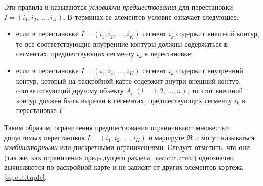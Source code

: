 Эти правила и называются \textit{условиями предшествования}
для перестановки
$ I = (i_1, i_2, \,\dots, i_K)$.
В терминах ее элементов условие означает следующее:
\begin{itemize}
  \item
  если в перестановке
  $ I = (i_1, i_2, \,\dots, i_K)$
  сегмент $i_k$
  содержит внешний контур,
  то все соответствующие внутренние контуры должны содержаться в сегментах,
  предшествующих сегменту $i_k$
  в перестановке;
  \item
  если в перестановке
  $ I = (i_1, i_2, \,\dots, i_K)$
  сегмент $i_k$
  содержит  внутренний контур,
  который на раскройной карте содержит внутри внешний контур,
  соответствующий другому объекту
  $A_l$
  $(l=1,2, \,\dots, n)$,
  то этот внешний контур должен быть вырезан в сегментах,
  предшествующих сегменту $i_k$ в перестановке $I$.
\end{itemize}

Таким образом,
ограничения предшествования ограничивают
множество допустимых перестановок
$ I = (i_1, i_2, \,\dots, i_K)$
в маршруте $\mathfrak R$
и могут называться
\textit{комбинаторными}
или дискретными ограничениями.
Следует отметить,
что они
(так же, как ограничения
предыдущего раздела~\ref{sec:cut.area})
однозначно вычисляются по раскройной карте
и не зависят от других элементов кортежа~
\eqref{eq:cut.tuple}.
